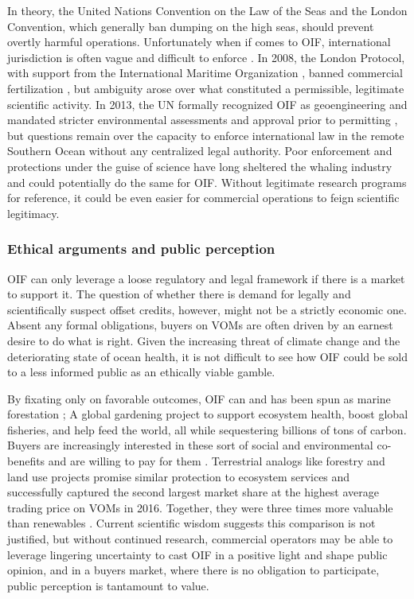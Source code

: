 In theory, the United Nations Convention on the Law of the Seas and the London Convention, which generally ban dumping on the high seas, should prevent overtly harmful operations. Unfortunately when if comes to OIF, international jurisdiction is often vague and difficult to enforce \parencite{BertramPotentialOceanIron2011}. In 2008, the London Protocol, with support from the International Maritime Organization \parencite{IMONoteInternationalMaritime2008}, banned commercial fertilization \parencite{ResolutionLCLPRegulation2008}, but ambiguity arose over what constituted a permissible, legitimate scientific activity\parencite{BertramPotentialOceanIron2011, GoodellLittleCashSide2011}. In 2013, the UN formally recognized OIF as geoengineering and mandated stricter environmental assessments and approval prior to permitting \parencite{ResolutionLPAmendment2013}, but questions remain over the capacity to enforce international law in the remote Southern Ocean without any centralized legal authority. Poor enforcement and protections under the guise of science have long sheltered the whaling industry \parencite{MangelWhalessciencescientific2016} and could potentially do the same for OIF. Without legitimate research programs for reference, it could be even easier for commercial operations to feign scientific legitimacy.  

\subsubsection{Ethical arguments and public perception}

OIF can only leverage a loose regulatory and legal framework if there is a market to support it. The question of whether there is demand for legally and scientifically suspect offset credits, however, might not be a strictly economic one. Absent any formal obligations, buyers on VOMs are often driven by an earnest desire to do what is right. Given the increasing threat of climate change and the deteriorating state of ocean health, it is not difficult to see how OIF could be sold to a less informed public as an ethically viable gamble.  

By fixating only on favorable outcomes, OIF can and has been spun as marine forestation \parencite{GoodellLittleCashSide2011a}; A global gardening project to support ecosystem health, boost global fisheries, and help feed the world, all while sequestering billions of tons of carbon. Buyers are increasingly interested in these sort of social and environmental co-benefits and are willing to pay for them \parencite{HamrickRaisingAmbitionState2016}. Terrestrial analogs like forestry and land use projects promise similar protection to ecosystem services and successfully captured the second largest market share at the highest average trading price on VOMs in 2016. Together, they were three times more valuable than renewables \parencite{HamrickRaisingAmbitionState2016}. Current scientific wisdom suggests this comparison is not justified, but without continued research, commercial operators may be able to leverage lingering uncertainty to cast OIF in a positive light and shape public opinion, and in a buyers market, where there is no obligation to participate, public perception is tantamount to value.  

